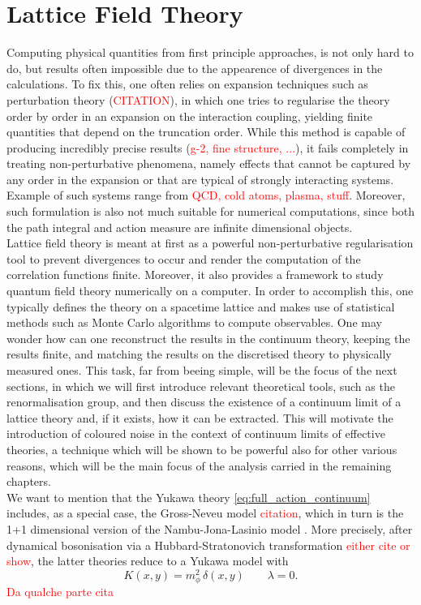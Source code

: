 \section{Lattice Field Theory}
\vspace{20pt}
Computing physical quantities from first principle approaches, is not only hard to do, but results often impossible due to the appearence of divergences in the calculations. To fix this, one often relies on expansion techniques such as perturbation theory (\textcolor{red}{CITATION}), in which one tries to regularise the theory order by order in an expansion on the interaction coupling, yielding finite quantities that depend on the truncation order.  While this method is capable of producing incredibly precise results (\textcolor{red}{g-2, fine structure, ...}), it fails completely in treating non-perturbative phenomena, namely effects that cannot be captured by any order in the expansion or that are typical of strongly interacting systems. Example of such systems range from \textcolor{red}{QCD, cold atoms, plasma, stuff}. 
Moreover, such formulation is also not much suitable for numerical computations, since both the path integral and action measure are infinite dimensional objects. \\
Lattice field theory \cite{Montvay1994QuantumLattice,rothe_LGT,gattringer_LQCD,creutz_2023} is meant at first as a powerful non-perturbative regularisation tool to prevent divergences to occur and render the computation of the correlation functions finite. Moreover, it also provides a framework to study quantum field theory numerically on a computer. In order to accomplish this, one typically defines the theory on a spacetime lattice and makes use of statistical methods such as Monte Carlo algorithms to compute observables. One may wonder how can one reconstruct the results in the continuum theory, keeping the results finite, and matching the results on the discretised theory to physically measured ones. This task, far from beeing simple, will be the focus of the next sections, in which we will first introduce relevant theoretical tools, such as the renormalisation group, and then discuss the existence of a continuum limit of a lattice theory and, if it exists, how it can be extracted. This will motivate the introduction of coloured noise in the context of continuum limits of effective theories, a technique which will be shown to be powerful also for other various reasons, which will be the main focus of the analysis carried in the remaining chapters. \\
We want to mention that the Yukawa theory \eqref{eq:full_action_continuum} includes, as a special case, the Gross-Neveu model \textcolor{red}{citation}, which in turn is the 1+1 dimensional version of the Nambu-Jona-Lasinio model \cite{Nambu1961DynamicalI, Nambu1961DynamicalII}.
More precisely, after dynamical bosonisation via a Hubbard-Stratonovich transformation \textcolor{red}{either cite or show}, the latter theories reduce to a Yukawa model with 
\begin{equation*}
    K(x,y) = m_\phi^2 \, \delta(x,y) \qquad \lambda = 0.
\end{equation*}
\textcolor{red}{Da qualche parte cita \cite{carosso2020novel}}

